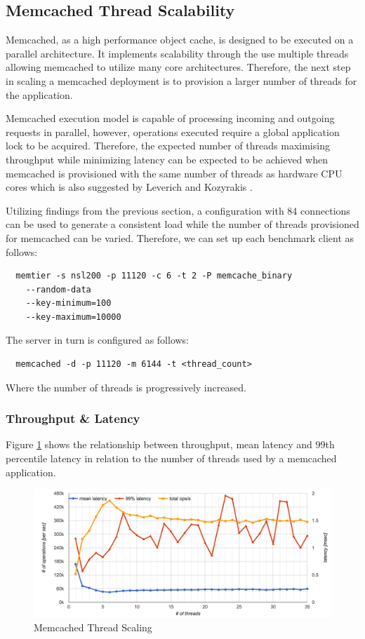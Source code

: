 \subsection{Memcached Thread Scalability}
Memcached, as a high performance object cache, is designed to be executed on a parallel architecture. It implements scalability through the use multiple threads allowing memcached to utilize many core architectures. Therefore, the next step in scaling a memcached deployment is to provision a larger number of threads for the application.

Memcached execution model is capable of processing incoming and outgoing requests in parallel, however, operations executed require a global application lock to be acquired. Therefore, the expected number of threads maximising throughput while minimizing latency can be expected to be achieved when memcached is provisioned with the same number of threads as hardware CPU cores which is also suggested by Leverich and Kozyrakis \cite{leverich2014reconciling}.

Utilizing findings from the previous section, a configuration with 84 connections can be used to generate a consistent load while the number of threads provisioned for memcached can be varied. Therefore, we can set up each benchmark client as follows:

\begin{lstlisting}
  memtier -s nsl200 -p 11120 -c 6 -t 2 -P memcache_binary
    --random-data
    --key-minimum=100
    --key-maximum=10000
\end{lstlisting}

The server in turn is configured as follows:
\begin{lstlisting}
  memcached -d -p 11120 -m 6144 -t <thread_count>
\end{lstlisting}

Where the number of threads is progressively increased.

\subsubsection{Throughput \& Latency}

Figure \ref{fig:memcached-threads} shows the relationship between throughput, mean latency and 99th percentile latency in relation to the number of threads used by a memcached application.

\begin{figure}[h]
    \includegraphics[width=\textwidth]{./res/5_memcached_threads.png}
    \caption{Memcached Thread Scaling}
    \label{fig:memcached-threads}
\end{figure}


